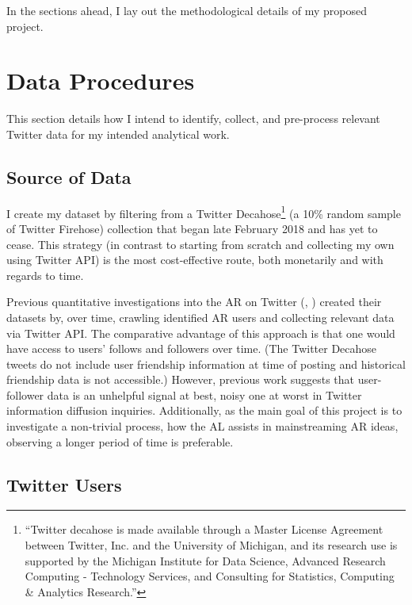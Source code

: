 \documentclass[acmlarge, screen, authorversion]{acmart}
\begin{document}
In the sections ahead, I lay out the methodological details of my proposed project.


\section{Data Procedures}
This section details how I intend to identify, collect, and pre-process relevant Twitter data for my intended analytical work.

    \subsection{Source of Data}
    
    I create my dataset by filtering from a Twitter Decahose\footnote{“Twitter decahose is made available through a Master License Agreement between Twitter, Inc. and the University of Michigan, and its research use is supported by the Michigan Institute for Data Science, Advanced Research Computing - Technology Services, and Consulting for Statistics, Computing \& Analytics Research.”} (a 10\% random sample of Twitter Firehose) collection that began late February 2018 and has yet to cease. This strategy (in contrast to starting from scratch and collecting my own using Twitter API) is the most cost-effective route, both monetarily and with regards to time.

    Previous quantitative investigations into the AR on Twitter (\cite{bergerAltrightTwitterCensus2018}, \cite{alizadehPsychologyMoralityPolitical2019}) created their datasets by, over time, crawling identified AR users and collecting relevant data via Twitter API. The comparative advantage of this approach is that one would have access to users' follows and followers over time. (The Twitter Decahose tweets do not include user friendship information at time of posting and historical friendship data is not accessible.) However, previous work \cite{chaMeasuringUserInfluence2010, versteegInformationtheoreticMeasuresInfluence2013} suggests that user-follower data is an unhelpful signal at best, noisy one at worst in Twitter information diffusion inquiries. Additionally, as the main goal of this project is to investigate a non-trivial process, how the AL assists in mainstreaming AR ideas, observing a longer period of time is preferable. 

\subsection{Twitter Users}
\end{document}
